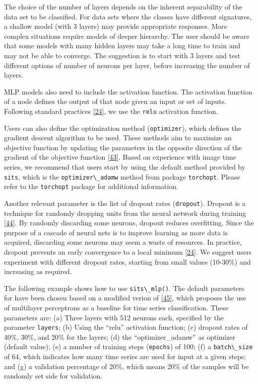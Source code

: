\documentclass[
  11pt,
]{report}
\newcommand{\passthrough}[1]{#1}
\begin{document}
The choice of the number of layers depends on the inherent separability
of the data set to be classified. For data sets where the classes have
different signatures, a shallow model (with 3 layers) may provide
appropriate responses. More complex situations require models of deeper
hierarchy. The user should be aware that some models with many hidden
layers may take a long time to train and may not be able to converge.
The suggestion is to start with 3 layers and test different options of
number of neurons per layer, before increasing the number of layers.

MLP models also need to include the activation function. The activation
function of a node defines the output of that node given an input or set
of inputs. Following standard practices
\protect\hyperlink{ref-Goodfellow2016}{{[}24{]}}, we use the
\passthrough{\lstinline!relu!} activation function.

Users can also define the optimization method
(\passthrough{\lstinline!optimizer!}), which defines the gradient
descent algorithm to be used. These methods aim to maximize an objective
function by updating the parameters in the opposite direction of the
gradient of the objective function
\protect\hyperlink{ref-Ruder2016}{{[}43{]}}. Based on experience with
image time series, we recommend that users start by using the default
method provided by \passthrough{\lstinline!sits!}, which is the
\passthrough{\lstinline!optimizer\_adamw!} method from package
\passthrough{\lstinline!torchopt!}. Please refer to the
\passthrough{\lstinline!torchopt!} package for additional information.

Another relevant parameter is the list of dropout rates
(\passthrough{\lstinline!dropout!}). Dropout is a technique for randomly
dropping units from the neural network during training
\protect\hyperlink{ref-Srivastava2014}{{[}44{]}}. By randomly discarding
some neurons, dropout reduces overfitting. Since the purpose of a
cascade of neural nets is to improve learning as more data is acquired,
discarding some neurons may seem a waste of resources. In practice,
dropout prevents an early convergence to a local minimum
\protect\hyperlink{ref-Goodfellow2016}{{[}24{]}}. We suggest users
experiment with different dropout rates, starting from small values
(10-30\%) and increasing as required.

The following example shows how to use
\passthrough{\lstinline!sits\_mlp()!}. The default parameters for have
been chosen based on a modified verion of
\protect\hyperlink{ref-Wang2017}{{[}45{]}}, which proposes the use of
multilayer perceptrons as a baseline for time series classification.
These parameters are: (a) Three layers with 512 neurons each, specified
by the parameter \passthrough{\lstinline!layers!}; (b) Using the
``relu'' activation function; (c) dropout rates of 40\%, 30\%, and 20\%
for the layers; (d) the ``optimizer\_adamw'' as optimizer (default
value); (e) a number of training steps
(\passthrough{\lstinline!epochs!}) of 100; (f) a
\passthrough{\lstinline!batch\_size!} of 64, which indicates how many
time series are used for input at a given steps; and (g) a validation
percentage of 20\%, which means 20\% of the samples will be randomly set
side for validation.
\end{document}
